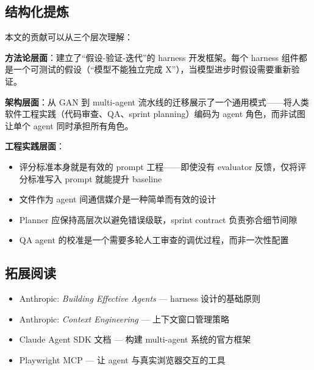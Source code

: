 \documentclass[a4paper]{article}
\begin{document}
\subsection{结构化提炼}

本文的贡献可以从三个层次理解：

\textbf{方法论层面}：建立了``假设-验证-迭代''的 harness 开发框架。每个 harness 组件都是一个可测试的假设（``模型不能独立完成 X''），当模型进步时假设需要重新验证。

\textbf{架构层面}：从 GAN 到 multi-agent 流水线的迁移展示了一个通用模式——将人类软件工程实践（代码审查、QA、sprint planning）编码为 agent 角色，而非试图让单个 agent 同时承担所有角色。

\textbf{工程实践层面}：
\begin{itemize}
    \item 评分标准本身就是有效的 prompt 工程——即使没有 evaluator 反馈，仅将评分标准写入 prompt 就能提升 baseline
    \item 文件作为 agent 间通信媒介是一种简单而有效的设计
    \item Planner 应保持高层次以避免错误级联，sprint contract 负责弥合细节间隙
    \item QA agent 的校准是一个需要多轮人工审查的调优过程，而非一次性配置
\end{itemize}

\subsection{拓展阅读}

\begin{itemize}
    \item Anthropic: \textit{Building Effective Agents} — harness 设计的基础原则
    \item Anthropic: \textit{Context Engineering} — 上下文窗口管理策略
    \item Claude Agent SDK 文档 — 构建 multi-agent 系统的官方框架
    \item Playwright MCP — 让 agent 与真实浏览器交互的工具
\end{itemize}

\end{document}

